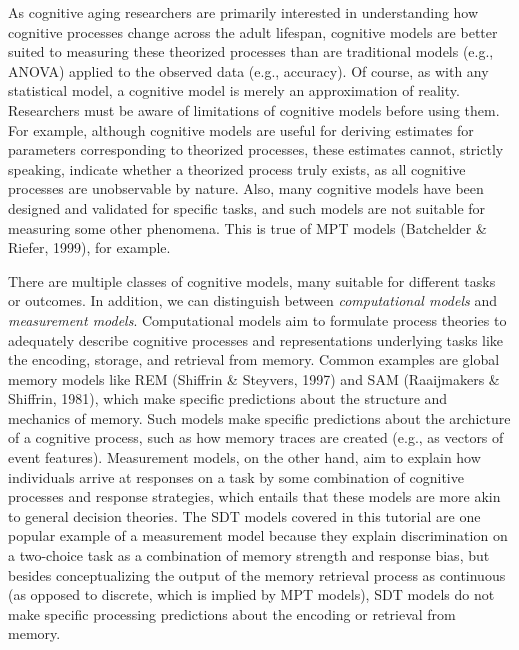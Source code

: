\documentclass[
  english,
  ,man,floatsintext]{apa6}
\begin{document}
As cognitive aging researchers are primarily interested in understanding how cognitive processes change across the adult lifespan, cognitive models are better suited to measuring these theorized processes than are traditional models (e.g., ANOVA) applied to the observed data (e.g., accuracy). Of course, as with any statistical model, a cognitive model is merely an approximation of reality. Researchers must be aware of limitations of cognitive models before using them. For example, although cognitive models are useful for deriving estimates for parameters corresponding to theorized processes, these estimates cannot, strictly speaking, indicate whether a theorized process truly exists, as all cognitive processes are unobservable by nature. Also, many cognitive models have been designed and validated for specific tasks, and such models are not suitable for measuring some other phenomena. This is true of MPT models (Batchelder \& Riefer, 1999), for example.

There are multiple classes of cognitive models, many suitable for different tasks or outcomes. In addition, we can distinguish between \emph{computational models} and \emph{measurement models}. Computational models aim to formulate process theories to adequately describe cognitive processes and representations underlying tasks like the encoding, storage, and retrieval from memory. Common examples are global memory models like REM (Shiffrin \& Steyvers, 1997) and SAM (Raaijmakers \& Shiffrin, 1981), which make specific predictions about the structure and mechanics of memory. Such models make specific predictions about the archicture of a cognitive process, such as how memory traces are created (e.g., as vectors of event features). Measurement models, on the other hand, aim to explain how individuals arrive at responses on a task by some combination of cognitive processes and response strategies, which entails that these models are more akin to general decision theories. The SDT models covered in this tutorial are one popular example of a measurement model because they explain discrimination on a two-choice task as a combination of memory strength and response bias, but besides conceptualizing the output of the memory retrieval process as continuous (as opposed to discrete, which is implied by MPT models), SDT models do not make specific processing predictions about the encoding or retrieval from memory.
\end{document}
